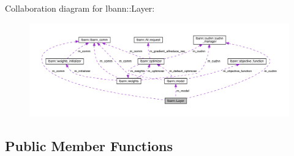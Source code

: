 Collaboration diagram for lbann\+:\+:Layer\+:\nopagebreak
\begin{figure}[H]
\begin{center}
\leavevmode
\includegraphics[width=350pt]{classlbann_1_1Layer__coll__graph}
\end{center}
\end{figure}
\subsection*{Public Member Functions}
